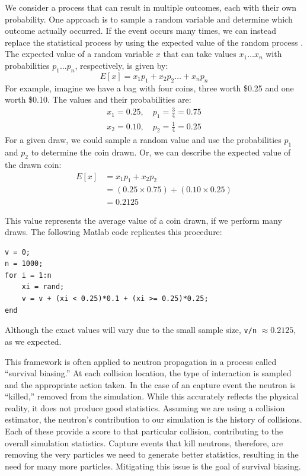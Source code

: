 We consider a process that can result in multiple outcomes, each with
their own probability. One approach is to sample a random variable and
determine which outcome actually occurred. If the event occurs many
times, we can instead replace the
statistical process by using the expected value of the random process
\cite{lux1991}. The expected value of a random variable $x$ that can
take values ${x_1 \ldots x_n}$ with  probabilities ${p_1 \ldots p_n}$, respectively,
is given by:
\begin{equation}
  \label{eq:expval}
  E[x] = x_1p_1 + x_2p_2 \ldots + x_{n}p_n
\end{equation}
For example, imagine we have a bag with four coins, three worth \$0.25 and
one worth \$0.10. The values and their probabilities are:
\begin{align*}
  x_1 = 0.25, \quad p_1 = \frac{3}{4} = 0.75 \\
  x_2 = 0.10, \quad p_2 = \frac{1}{4} = 0.25
\end{align*}
For a given draw, we could sample a random value and use the
probabilities $p_1$ and $p_2$ to determine the coin drawn. Or, we can
describe the expected value of the drawn coin:
\begin{align*}
  E[x] &= x_1p_1 + x_2p_2 \\
  &= (0.25 \times 0.75) + (0.10 \times 0.25) \\
  &= 0.2125
\end{align*}
\begin{minipage}{1.0\linewidth}
  This value represents the average value of a coin drawn, if we
  perform many draws. The following Matlab code replicates this
  procedure:
\begin{lstlisting}
v = 0;
n = 1000;
for i = 1:n
    xi = rand;  
    v = v + (xi < 0.25)*0.1 + (xi >= 0.25)*0.25;
end
\end{lstlisting}
\end{minipage}

Although the exact values will vary due to the small sample size, \verb|v/n|
$\approx 0.2125$, as we expected.

This framework is often applied to neutron propagation in a process
called ``survival biasing.'' At each collision location, the type of
interaction is sampled and the appropriate action taken. In the case
of an capture event the neutron is ``killed,'' removed from the
simulation. While this accurately reflects the physical reality, it
does not produce good statistics. Assuming we are using a collision
estimator, the neutron's contribution to our simulation is the history
of collisions. Each of these provide a score to that particular
collision, contributing to the overall simulation
statistics. Capture events that kill neutrons, therefore, are
removing the very particles we need to generate better statistics,
resulting in the need for many more particles. Mitigating this issue
is the goal of survival biasing.

